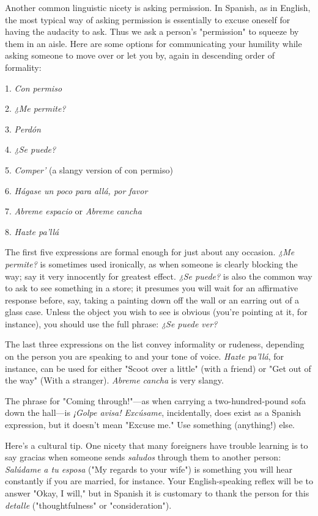 \documentclass[14pt,a4paper,oneside]{memoir}
\newcommand{\bsk}{\vspace{20pt}}
\begin{document}
Another common linguistic nicety is asking permission. In
Spanish, as in English, the most typical way of asking permission is
essentially to excuse oneself for having the audacity to ask. Thus we
ask a person's "permission" to squeeze by them in an aisle. Here are
some options for communicating your humility while asking someone
to move over or let you by, again in descending order of formality:

\bsk

1. \emph{Con permiso}

2. \emph{¿Me permite?}

3. \emph{Perdón}

4. \emph{¿Se puede?}

5. \emph{Comper'} (a slangy version of con permiso)

6. \emph{Hágase un poco para allá, por favor}

7. \emph{Abreme espacio} or \emph{Abreme cancha}

8. \emph{Hazte pa'llá}

\bsk

The first five expressions are formal enough for just about any occasion. \emph{¿Me permite?} is sometimes used ironically, as when someone is
clearly blocking the way; say it very innocently for greatest effect. \emph{¿Se
	puede?} is also the common way to ask to see something in a store; it
presumes you will wait for an affirmative response before, say, taking a
painting down off the wall or an earring out of a glass case. Unless the
object you wish to see is obvious (you're pointing at it, for instance),
you should use the full phrase: \emph{¿Se puede ver?}

The last three expressions on the list convey informality or
rudeness, depending on the person you are speaking to and your
tone of voice. \emph{Hazte pa'llá}, for instance, can be used for either "Scoot
over a little" (with a friend) or "Get out of the way" (With a stranger).
\emph{Abreme cancha} is very slangy.

The phrase for "Coming through!"---as when carrying a two-hundred-pound sofa down the hall---is \emph{¡Golpe avisa! Excúsame}, incidentally, does exist as a Spanish expression, but it doesn't mean "Excuse me." Use something (anything!) else.

Here's a cultural tip. One nicety that many foreigners
have trouble learning is to say gracias when someone sends \emph{saludos}
through them to another person: \emph{Salúdame a tu esposa} ("My regards to your wife") is something you will hear constantly if you are
married, for instance. Your English-speaking reflex will be to answer
"Okay, I will," but in Spanish it is customary to thank the person for
this \emph{detalle} ("thoughtfulness" or "consideration").
\end{document}
